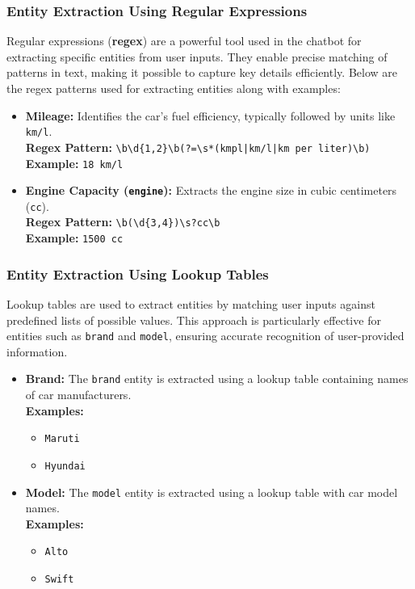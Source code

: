 \documentclass{beamer}
\begin{document}
	
\begin{frame}
	\frametitle{Entity Extraction Using Regular Expressions}

	Regular expressions (\textbf{regex}) are a powerful tool used in the chatbot for extracting specific entities from user inputs. They enable precise matching of patterns in text, making it possible to capture key details efficiently. Below are the regex patterns used for extracting entities along with examples:

	\begin{itemize}
		
		\item \textbf{Mileage:} Identifies the car's fuel efficiency, typically followed by units like \texttt{km/l}.
		\\ \textbf{Regex Pattern:} \texttt{\textbackslash b\textbackslash d\{1,2\}\textbackslash b(?=\textbackslash s*(kmpl|km/l|km per liter)\textbackslash b)}
		\\ \textbf{Example:} \texttt{18 km/l}
		
		\item \textbf{Engine Capacity (\texttt{engine}):} Extracts the engine size in cubic centimeters (\texttt{cc}).
		\\ \textbf{Regex Pattern:} \texttt{\textbackslash b(\textbackslash d\{3,4\})\textbackslash s?cc\textbackslash b}
		\\ \textbf{Example:} \texttt{1500 cc}
	\end{itemize}
\end{frame}

\begin{frame}
	\frametitle{Entity Extraction Using Lookup Tables}

	Lookup tables are used to extract entities by matching user inputs against predefined lists of possible values. This approach is particularly effective for entities such as \texttt{brand} and \texttt{model}, ensuring accurate recognition of user-provided information.

	\begin{itemize}
		\item \textbf{Brand:} The \texttt{brand} entity is extracted using a lookup table containing names of car manufacturers.
		\\ \textbf{Examples:}
		\begin{itemize}
			\item \texttt{Maruti}
			\item \texttt{Hyundai}
		\end{itemize}
		
		\item \textbf{Model:} The \texttt{model} entity is extracted using a lookup table with car model names.
		\\ \textbf{Examples:}
		\begin{itemize}
			\item \texttt{Alto}
			\item \texttt{Swift}
		\end{itemize}
	\end{itemize}
\end{frame}
\end{document}
